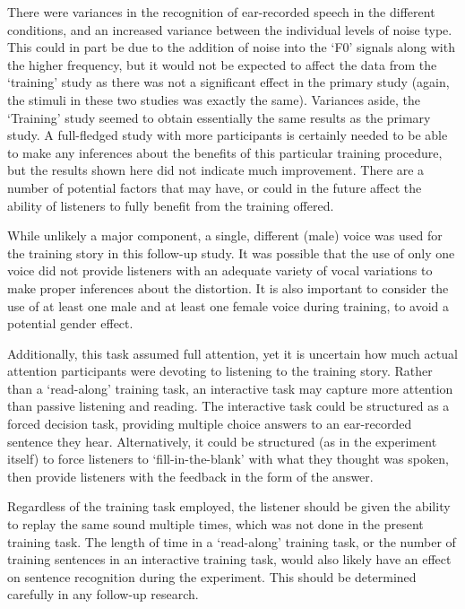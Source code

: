 There were variances in the recognition of ear-recorded speech in the different conditions, and an increased variance between the individual levels of noise type.  This could in part be due to the addition of noise into the `F0' signals along with the higher frequency, but it would not be expected to affect the data from the `training' study as there was not a significant effect in the primary study (again, the stimuli in these two studies was exactly the same).  Variances aside, the `Training' study seemed to obtain essentially the same results as the primary study.  A full-fledged study with more participants is certainly needed to be able to make any inferences about the benefits of this particular training procedure, but the results shown here did not indicate much improvement.  There are a number of potential factors that may have, or could in the future affect the ability of listeners to fully benefit from the training offered.  

While unlikely a major component, a single, different (male) voice was used for the training story in this follow-up study.  It was possible that the use of only one voice did not provide listeners with an adequate variety of vocal variations to make proper inferences about the distortion.  It is also important to consider the use of at least one male and at least one female voice during training, to avoid a potential gender effect.

Additionally, this task assumed full attention, yet it is uncertain how much actual attention participants were devoting to listening to the training story.  Rather than a `read-along' training task, an interactive task may capture more attention than passive listening and reading.  The interactive task could be structured as a forced decision task, providing multiple choice answers to an ear-recorded sentence they hear.  Alternatively, it could be structured (as in the experiment itself) to force listeners to `fill-in-the-blank' with what they thought was spoken, then provide listeners with the feedback in the form of the answer.  

Regardless of the training task employed, the listener should be given the ability to replay the same sound multiple times, which was not done in the present training task.  The length of time in a `read-along' training task, or the number of training sentences in an interactive training task, would also likely have an effect on sentence recognition during the experiment.  This should be determined carefully in any follow-up research.

